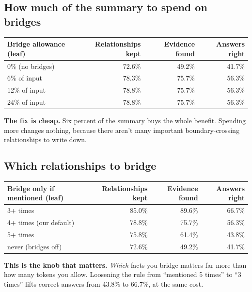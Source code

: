 \documentclass[11pt]{article}
\begin{document}
\subsection{How much of the summary to spend on bridges}

\begin{center}\small
\begin{tabular}{lrrr}
\toprule
\textbf{Bridge allowance} (leaf) & \textbf{Relationships kept} & \textbf{Evidence found} & \textbf{Answers right} \\
\midrule
0\% (no bridges)  & 72.6\% & 49.2\% & 41.7\% \\
6\% of input      & 78.3\% & 75.7\% & 56.3\% \\
12\% of input     & 78.8\% & 75.7\% & 56.3\% \\
24\% of input     & 78.8\% & 75.7\% & 56.3\% \\
\bottomrule
\end{tabular}
\end{center}

\noindent\textbf{The fix is cheap.} Six percent of the summary buys the whole benefit. Spending more changes nothing, because there aren't many important boundary-crossing relationships to write down.

\subsection{Which relationships to bridge}

\begin{center}\small
\begin{tabular}{lrrr}
\toprule
\textbf{Bridge only if mentioned} (leaf) & \textbf{Relationships kept} & \textbf{Evidence found} & \textbf{Answers right} \\
\midrule
3+ times & 85.0\% & 89.6\% & 66.7\% \\
4+ times (our default) & 78.8\% & 75.7\% & 56.3\% \\
5+ times & 75.8\% & 61.4\% & 43.8\% \\
never (bridges off) & 72.6\% & 49.2\% & 41.7\% \\
\bottomrule
\end{tabular}
\end{center}

\noindent\textbf{This is the knob that matters.} \emph{Which} facts you bridge matters far more than how many tokens you allow. Loosening the rule from ``mentioned 5 times'' to ``3 times'' lifts correct answers from 43.8\% to 66.7\%, at the same cost.
\end{document}
